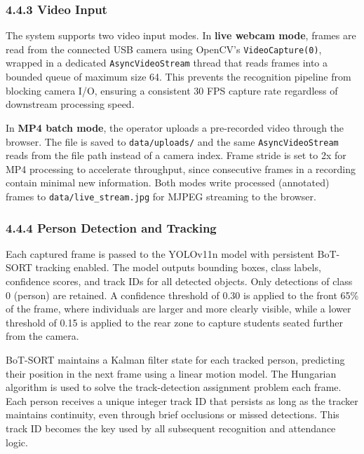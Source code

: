\documentclass{report}
\begin{document}
\subsubsection*{4.4.3 Video Input}
\normalsize{
The system supports two video input modes. In \textbf{live webcam mode}, frames are read from the\vspace{3pt} connected USB camera using OpenCV's \texttt{VideoCapture(0)}, wrapped in a dedicated\vspace{3pt} \texttt{AsyncVideoStream} thread that reads frames into a bounded queue of maximum size 64. This\vspace{3pt} prevents the recognition pipeline from blocking camera I/O, ensuring a consistent 30 FPS capture\vspace{3pt} rate regardless of downstream processing speed.

In \textbf{MP4 batch mode}, the operator uploads a pre-recorded video through the browser. The file is\vspace{3pt} saved to \texttt{data/uploads/} and the same \texttt{AsyncVideoStream} reads from the file path instead\vspace{3pt} of a camera index. Frame stride is set to 2x for MP4 processing to accelerate throughput, since\vspace{3pt} consecutive frames in a recording contain minimal new information. Both modes write processed\vspace{3pt} (annotated) frames to \texttt{data/live\_stream.jpg} for MJPEG streaming to the browser.
}

\subsubsection*{4.4.4 Person Detection and Tracking}
\normalsize{
Each captured frame is passed to the YOLOv11n model with persistent BoT-SORT tracking enabled.\vspace{3pt} The model outputs bounding boxes, class labels, confidence scores, and track IDs for all detected\vspace{3pt} objects. Only detections of class 0 (person) are retained. A confidence threshold of 0.30 is applied\vspace{3pt} to the front 65\% of the frame, where individuals are larger and more clearly visible, while a lower\vspace{3pt} threshold of 0.15 is applied to the rear zone to capture students seated further from the camera.

BoT-SORT maintains a Kalman filter state for each tracked person, predicting their position in the\vspace{3pt} next frame using a linear motion model. The Hungarian algorithm is used to solve the track-detection\vspace{3pt} assignment problem each frame. Each person receives a unique integer track ID that persists as long\vspace{3pt} as the tracker maintains continuity, even through brief occlusions or missed detections. This track\vspace{3pt} ID becomes the key used by all subsequent recognition and attendance logic.
}
\end{document}
